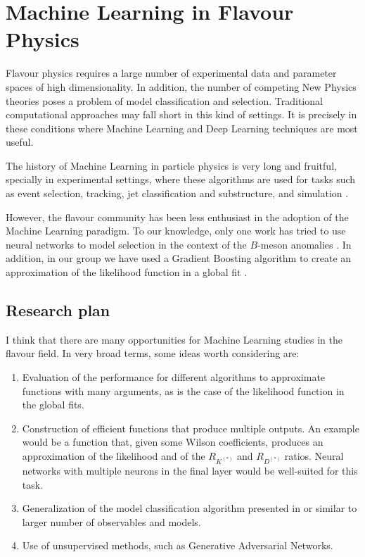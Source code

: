 \documentclass[12pt, a4paper]{article}
\begin{document}
\section{Machine Learning in Flavour Physics}

Flavour physics requires a large number of experimental data and parameter spaces of high dimensionality. In addition, the number of competing New Physics theories poses a problem of model classification and selection. Traditional computational approaches may fall short in this kind of settings. It is precisely in these conditions where Machine Learning and Deep Learning techniques are most useful.

The history of Machine Learning in particle physics is very long and fruitful, specially in experimental settings, where these algorithms are used for tasks such as event selection, tracking, jet classification and substructure, and simulation \cite{Guest:2018yhq,Albertsson:2018maf,Schwartz:2021ftp,Alanazi:2021grv}. 

However, the flavour community has been less enthusiast in the adoption of the Machine Learning paradigm. To our knowledge, only one work has tried to use neural networks to model selection in the context of the $B$-meson anomalies \cite{Bhattacharya:2020vme}. In addition, in our group we have used a Gradient Boosting algorithm to create an approximation of the likelihood function in a global fit \cite{Alda:2021krg}.  

\subsection{Research plan}
I think that there are many opportunities for Machine Learning studies in the flavour field. In very broad terms, some ideas worth considering are:
\begin{enumerate}
\item Evaluation of the performance for different algorithms to approximate functions with many arguments, as is the case of the likelihood function in the global fits.
\item Construction of efficient functions that produce multiple outputs. An example would be a function that, given some Wilson coefficients, produces an approximation of the likelihood and of the $R_{K^{(*)}}$ and $R_{D^{(*)}} $ ratios. Neural networks with multiple neurons in the final layer would be well-suited for this task.
\item Generalization of the model classification algorithm presented in \cite{Bhattacharya:2020vme} or similar to larger number of observables and models.
\item Use of unsupervised methods, such as Generative Adversarial Networks.
\end{enumerate}
\end{document}
